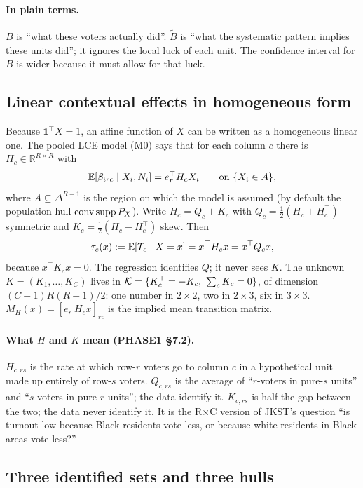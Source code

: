 \paragraph{In plain terms.} $B$ is ``what these voters actually did''.
$\tilde B$ is ``what the systematic pattern implies these units did''; it
ignores the local luck of each unit. The confidence interval for $B$ is wider
because it must allow for that luck.

\subsection{Linear contextual effects in homogeneous form}

Because $\mathbf 1^\top X=1$, an affine function of $X$ can be written as a
homogeneous linear one. The pooled LCE model (M0) says that for each column $c$
there is $H_c\in\mathbb R^{R\times R}$ with
\begin{equation}\label{eq:lce}
\mathbb E[\beta_{irc}\mid X_i,N_i]=e_r^\top H_cX_i\qquad\text{on }\{X_i\in A\},
\end{equation}
where $A\subseteq\Delta^{R-1}$ is the region on which the model is assumed
(by default the population hull $\operatorname{conv}\operatorname{supp} P_X$). Write
$H_c=Q_c+K_c$ with $Q_c=\tfrac12(H_c+H_c^\top)$ symmetric and
$K_c=\tfrac12(H_c-H_c^\top)$ skew. Then
\[
\tau_c(x):=\mathbb E[T_c\mid X=x]=x^\top H_cx=x^\top Q_cx,
\]
because $x^\top K_cx=0$. The regression identifies $Q$; it never sees $K$.
The unknown $K=(K_1,\dots,K_C)$ lives in
$\Kspace=\{K_c^\top=-K_c,\ \sum_cK_c=0\}$, of dimension $(C-1)R(R-1)/2$: one
number in $2\times2$, two in $2\times3$, six in $3\times3$.
$M_H(x)=[e_r^\top H_cx]_{rc}$ is the implied mean transition matrix.

\paragraph{What $H$ and $K$ mean (PHASE1 \S7.2).} $H_{c,rs}$ is the rate at which
row-$r$ voters go to column $c$ in a hypothetical unit made up entirely of
row-$s$ voters. $Q_{c,rs}$ is the average of ``$r$-voters in pure-$s$ units''
and ``$s$-voters in pure-$r$ units''; the data identify it. $K_{c,rs}$ is half
the gap between the two; the data never identify it. It is the R$\times$C version
of JKST's question ``is turnout low because Black residents vote less, or
because white residents in Black areas vote less?''

\subsection{Three identified sets and three hulls}

